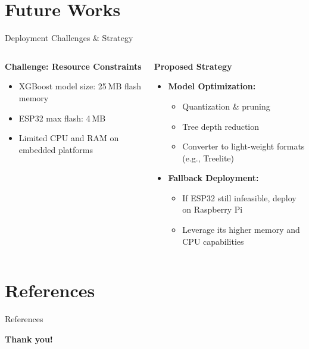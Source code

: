 \documentclass[aspectratio=169,xcolor=dvipsnames]{beamer}
\begin{document}
\section{Future Works}




\begin{frame}{Deployment Challenges \& Strategy}
\begin{columns}[T]
  \begin{column}{0.48\textwidth}
    \begin{block}{{\textbf{Challenge: Resource Constraints}}}
      \begin{itemize}
        \item XGBoost model size: 25 MB flash memory  
        \item ESP32 max flash: 4 MB  
        \item Limited CPU and RAM on embedded platforms  
      \end{itemize}
    \end{block}
  \end{column}
  
  \begin{column}{0.48\textwidth}
    \begin{exampleblock}{{\textbf{Proposed Strategy}}}
      \begin{itemize}
        \item \textbf{Model Optimization:}  
          \begin{itemize}
            \item Quantization \& pruning  
            \item Tree depth reduction  
            \item Converter to light-weight formats (e.g., Treelite)
          \end{itemize}
        \item \textbf{Fallback Deployment:}  
          \begin{itemize}
            \item If ESP32 still infeasible, deploy on Raspberry Pi  
            \item Leverage its higher memory and CPU capabilities  
          \end{itemize}
      \end{itemize}
    \end{exampleblock}
  \end{column}
\end{columns}
\end{frame} 

\section{References}
\begin{frame}[allowframebreaks]{References}
    \small
    \printbibliography
\end{frame}


\begin{frame}[plain]
  \centering
  \Huge \textbf{Thank you!}
\end{frame}
\end{document}
